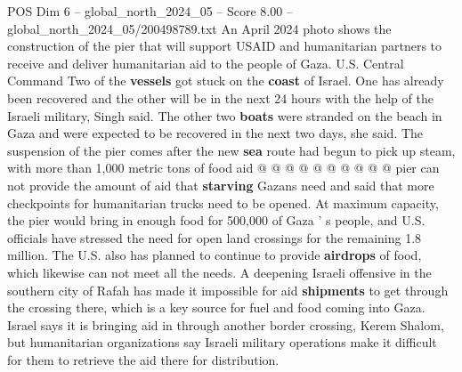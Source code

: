 \begin{textsample}{POS Dim 6 – global\_north\_2024\_05 – Score 8.00 – global\_north\_2024\_05/200498789.txt}
An April 2024 photo shows the construction of the pier that will support USAID and humanitarian partners to receive and deliver humanitarian aid to the people of Gaza.
U.S.
Central Command Two of the \textbf{vessels} got stuck on the \textbf{coast} of Israel.
One has already been recovered and the other will be in the next 24 hours with the help of the Israeli military, Singh said.
The other two \textbf{boats} were stranded on the beach in Gaza and were expected to be recovered in the next two days, she said.
The suspension of the pier comes after the new \textbf{sea} route had begun to pick up steam, with more than 1,000 metric tons of food aid @ @ @ @ @ @ @ @ @ @ pier can not provide the amount of aid that \textbf{starving} Gazans need and said that more checkpoints for humanitarian trucks need to be opened.
At maximum capacity, the pier would bring in enough food for 500,000 of Gaza ' s people, and U.S. officials have stressed the need for open land crossings for the remaining 1.8 million.
The U.S. also has planned to continue to provide \textbf{airdrops} of food, which likewise can not meet all the needs.
A deepening Israeli offensive in the southern city of Rafah has made it impossible for aid \textbf{shipments} to get through the crossing there, which is a key source for fuel and food coming into Gaza.
Israel says it is bringing aid in through another border crossing, Kerem Shalom, but humanitarian organizations say Israeli military operations make it difficult for them to retrieve the aid there for distribution.

\end{textsample}
